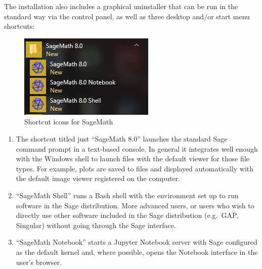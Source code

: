The installation also includes a graphical uninstaller that can be run in the
standard way via the control panel, as well as three desktop and/or start menu
shortcuts:

\begin{figure}[h!]
    \centering
    \includegraphics{screenshots/shortcuts}
    \caption{Shortcut icons for SageMath}
    \label{fig:shortcut-icons}
\end{figure}

\begin{enumerate}
\def\labelenumi{\arabic{enumi})}
\item
  The shortcut titled just ``SageMath 8.0'' launches the standard Sage
  command prompt in a text-based console. In general it integrates well
  enough with the Windows shell to launch files with the default viewer
  for those file types. For example, plots are saved to files and
  displayed automatically with the default image viewer registered on
  the computer.
\item
  ``SageMath Shell'' runs a Bash shell with the environment set up to
  run software in the Sage distribution. More advanced users, or users
  who wish to directly use other software included in the Sage
  distribution (e.g.~GAP, Singular) without going through the Sage
  interface.
\item
  ``SageMath Notebook'' starts a Jupyter Notebook server with Sage
  configured as the default kernel and, where possible, opens the
  Notebook interface in the user's browser.
\end{enumerate}


